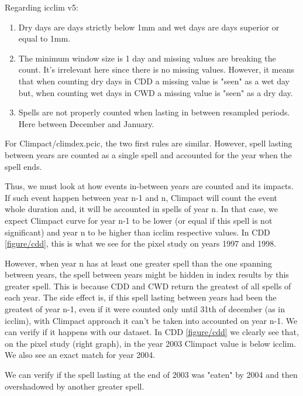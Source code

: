 \documentclass[a4paper,11pt]{article}
\begin{document}
            Regarding icclim v5:
            \begin{enumerate}
                \item Dry days are days strictly below 1mm and wet days are days superior or equal to 1mm.
                \item The minimum window size is 1 day and missing values are breaking the count. 
                    It's irrelevant here since there is no missing values. However, it means that when counting dry days in CDD a missing value is "seen" as a wet day but, when counting wet days in CWD a missing value is "seen" as a dry day.
                \item Spells are not properly counted when lasting in between resampled periods. Here between December and January.
            \end{enumerate}
            For Climpact/climdex.pcic, the two first rules are similar. 
            However, spell lasting between years are counted as a single spell and accounted for the year when the spell ends.
            
            Thus, we must look at how events in-between years are counted and its impacts.
            If such event happen between year n-1 and n, Climpact will count the event whole duration and, it will be accounted in spells of year n.
            In that case, we expect Climpact curve for year n-1 to be lower (or equal if this spell is not significant) and year n to be higher than icclim respective values.
            In CDD \ref{figure/cdd}, this is what we see for the pixel study on years 1997 and 1998.

            However, when year n has at least one greater spell than the one spanning between years, the spell between years might be hidden in index results by this greater spell.
            This is because CDD and CWD return the greatest of all spells of each year.
            The side effect is, if this spell lasting between years had been the greatest of year n-1, even if it were counted only until 31th of december (as in icclim), with Climpact approach it can't be taken into accounted on year n-1.
            We can verify if it happens with our dataset. In CDD \ref{figure/cdd} we clearly see that, on the pixel study (right graph), in the year 2003 Climpact value is below icclim.
            We also see an exact match for year 2004.
            
            We can verify if the spell lasting at the end of 2003 was "eaten" by 2004 and then overshadowed by another greater spell. 
            
\end{document}
